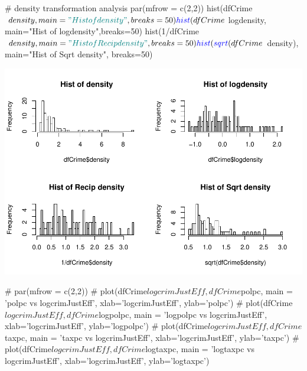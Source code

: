 \documentclass[]{article}
\newenvironment{Shaded}{}{}
\newcommand{\CommentTok}[1]{\textcolor[rgb]{0.00,0.50,0.00}{#1}}
\newcommand{\DataTypeTok}[1]{#1}
\newcommand{\DecValTok}[1]{#1}
\newcommand{\KeywordTok}[1]{\textcolor[rgb]{0.00,0.00,1.00}{#1}}
\newcommand{\NormalTok}[1]{#1}
\newcommand{\OperatorTok}[1]{#1}
\newcommand{\StringTok}[1]{\textcolor[rgb]{0.00,0.50,0.50}{#1}}
\begin{document}
\begin{Shaded}
\begin{Highlighting}[]
\CommentTok{# density transformation analysis }
\KeywordTok{par}\NormalTok{(}\DataTypeTok{mfrow =} \KeywordTok{c}\NormalTok{(}\DecValTok{2}\NormalTok{,}\DecValTok{2}\NormalTok{))}
\KeywordTok{hist}\NormalTok{(dfCrime}\OperatorTok{$}\NormalTok{density, }\DataTypeTok{main=}\StringTok{"Hist of density"}\NormalTok{, }\DataTypeTok{breaks=}\DecValTok{50}\NormalTok{)}
\KeywordTok{hist}\NormalTok{(dfCrime}\OperatorTok{$}\NormalTok{logdensity, }\DataTypeTok{main=}\StringTok{"Hist of logdensity"}\NormalTok{,}\DataTypeTok{breaks=}\DecValTok{50}\NormalTok{)}
\KeywordTok{hist}\NormalTok{(}\DecValTok{1}\OperatorTok{/}\NormalTok{dfCrime}\OperatorTok{$}\NormalTok{density, }\DataTypeTok{main=}\StringTok{"Hist of Recip density"}\NormalTok{, }\DataTypeTok{breaks=}\DecValTok{50}\NormalTok{)}
\KeywordTok{hist}\NormalTok{(}\KeywordTok{sqrt}\NormalTok{(dfCrime}\OperatorTok{$}\NormalTok{density), }\DataTypeTok{main=}\StringTok{"Hist of Sqrt density"}\NormalTok{, }\DataTypeTok{breaks=}\DecValTok{50}\NormalTok{)}
\end{Highlighting}
\end{Shaded}

\includegraphics{Bagnard_Gaustad_Hartman_Leung_Lab_3_files/figure-latex/unnamed-chunk-84-1.pdf}

\begin{Shaded}
\begin{Highlighting}[]
\CommentTok{# par(mfrow = c(2,2))}
\CommentTok{# plot(dfCrime$logcrimJustEff, dfCrime$polpc, main = 'polpc vs logcrimJustEff', xlab='logcrimJustEff', ylab='polpc')}
\CommentTok{# plot(dfCrime$logcrimJustEff, dfCrime$logpolpc, main = 'logpolpc vs logcrimJustEff', xlab='logcrimJustEff', ylab='logpolpc')}
\CommentTok{# plot(dfCrime$logcrimJustEff, dfCrime$taxpc, main = 'taxpc vs logcrimJustEff', xlab='logcrimJustEff', ylab='taxpc')}
\CommentTok{# plot(dfCrime$logcrimJustEff, dfCrime$logtaxpc, main = 'logtaxpc vs logcrimJustEff', xlab='logcrimJustEff', ylab='logtaxpc')}
\end{Highlighting}
\end{Shaded}
\end{document}
